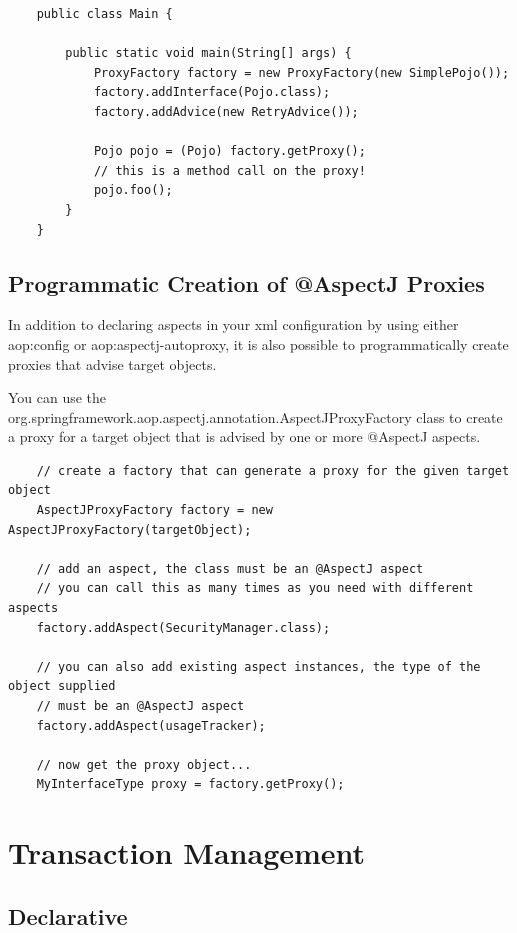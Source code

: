 \documentclass{scrartcl}
\begin{document}
\begin{lstlisting}
    public class Main {

        public static void main(String[] args) {
            ProxyFactory factory = new ProxyFactory(new SimplePojo());
            factory.addInterface(Pojo.class);
            factory.addAdvice(new RetryAdvice());

            Pojo pojo = (Pojo) factory.getProxy();
            // this is a method call on the proxy!
            pojo.foo();
        }
    }
\end{lstlisting}

\subsection{Programmatic Creation of @AspectJ Proxies}

In addition to declaring aspects in your xml configuration by using either aop:config or aop:aspectj-autoproxy, it is also possible to programmatically create proxies that advise target objects.

You can use the org.springframework.aop.aspectj.annotation.AspectJProxyFactory class to create a proxy for a target object that is advised by one or more @AspectJ aspects.

\begin{lstlisting}
    // create a factory that can generate a proxy for the given target object
    AspectJProxyFactory factory = new AspectJProxyFactory(targetObject);

    // add an aspect, the class must be an @AspectJ aspect
    // you can call this as many times as you need with different aspects
    factory.addAspect(SecurityManager.class);

    // you can also add existing aspect instances, the type of the object supplied
    // must be an @AspectJ aspect
    factory.addAspect(usageTracker);

    // now get the proxy object...
    MyInterfaceType proxy = factory.getProxy();
\end{lstlisting}

\section{Transaction Management}

\subsection{Declarative}
\end{document}
